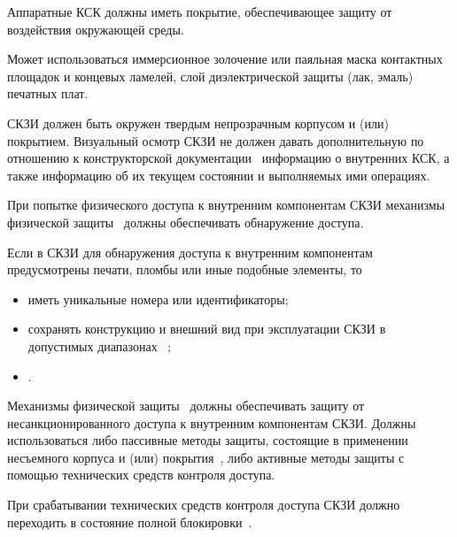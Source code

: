 \label{R.PS.Passivation}
Аппаратные КСК должны иметь покрытие, обеспечивающее защиту от воздействия 
окружающей среды. 

\begin{note}
Может использоваться иммерсионное золочение или паяльная маска контактных 
площадок и концевых ламелей, слой диэлектрической защиты (лак, эмаль) 
печатных плат.
\end{note}


\label{R.PS.Coating}
СКЗИ должен быть окружен твердым непрозрачным корпусом и (или) покрытием.
%
Визуальный осмотр СКЗИ не должен давать дополнительную по отношению 
к конструкторской документации~ информацию о внутренних 
КСК, а также информацию об их текущем состоянии и выполняемых ими 
операциях.


\label{R.PS.PassiveDetection}
При попытке физического доступа к внутренним компонентам СКЗИ механизмы 
физической защиты~ должны обеспечивать обнаружение доступа. 

\label{R.PS.PassiveDetectionId}
Если в СКЗИ для обнаружения доступа к внутренним компонентам предусмотрены 
печати, пломбы или иные подобные элементы, то
\begin{itemize}
\item
{} 
иметь уникальные номера или идентификаторы;
\item
{}
сохранять конструкцию и внешний вид при эксплуатации СКЗИ в допустимых 
диапазонах ~;
\item
{}.
\end{itemize}


\label{R.PS.ActiveDetectionSensor}
Механизмы физической защиты~ должны обеспечивать 
защиту от несанкционированного доступа к внутренним компонентам
СКЗИ. 
%
Должны использоваться либо пассивные методы защиты, состоящие в применении 
несъемного корпуса и (или) покрытия~, либо 
активные методы защиты с помощью технических средств контроля доступа.

\label{R.PS.Erasing}
При срабатывании технических средств контроля доступа СКЗИ должно 
переходить в состояние полной блокировки~.

